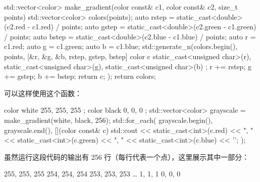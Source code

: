 \begin{cpp}
std::vector<color> make_gradient(color const& c1, color const& c2, size_t points)
{
    std::vector<color> colors(points);
    auto rstep = static_cast<double>(c2.red - c1.red) / points;
    auto gstep = static_cast<double>(c2.green - c1.green) / points;
    auto bstep = static_cast<double>(c2.blue - c1.blue) / points;
    auto r = c1.red;
    auto g = c1.green;
    auto b = c1.blue;
    std::generate_n(colors.begin(),
                    points,
                    [&r, &g, &b, rstep, gstep, bstep] {
        color c {
            static_cast<unsigned char>(r),
            static_cast<unsigned char>(g),
            static_cast<unsigned char>(b)
        };
        r += rstep;
        g += gstep;
        b += bstep;
        return c;
    });
    return colors;
}
\end{cpp}

可以这样使用这个函数：

\begin{cpp}
color white { 255, 255, 255 };
color black { 0, 0, 0 };
std::vector<color> grayscale = make_gradient(white, black, 256);
std::for_each(
    grayscale.begin(), grayscale.end(),
    [](color const& c) {
        std::cout <<
        static_cast<int>(c.red) << ", "
        << static_cast<int>(c.green) << ", "
        << static_cast<int>(c.blue) << '\n';
    });
\end{cpp}

虽然运行这段代码的输出有 256 行（每行代表一个点），这里展示其中一部分：

\begin{shell}
255, 255, 255
254, 254, 254
253, 253, 253
…
1, 1, 1
0, 0, 0
\end{shell}


